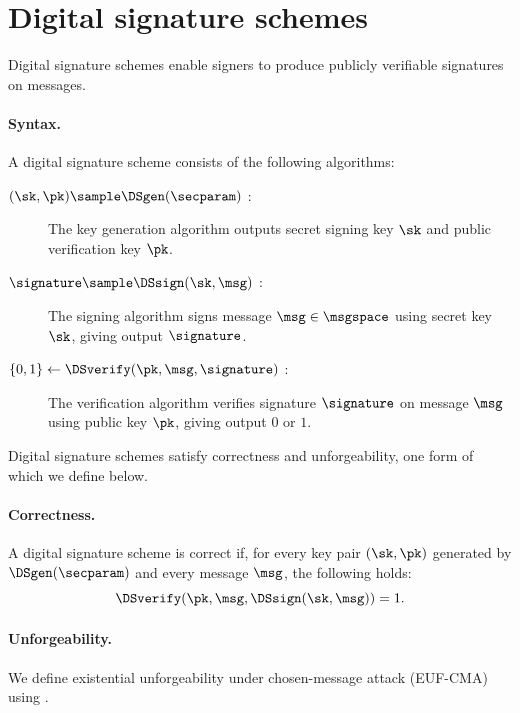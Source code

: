 \section{Digital signature schemes}\label{sec:prelims-signatures}

Digital signature schemes enable signers to produce publicly verifiable
signatures on messages.

\paragraph{Syntax.} A digital signature scheme consists of the following
algorithms:

\begin{description}

  \item[$(\sk,\pk) \sample \DSgen(\secparam)$ : ] The key generation algorithm
outputs secret signing key $\sk$ and public verification key $\pk$.

  \item[$\signature \sample \DSsign(\sk, \msg)$ : ] The signing algorithm signs
message $\msg \in \msgspace$ using secret key $\sk$, giving output $\signature$.

  \item[$\{0,1\} \leftarrow \DSverify(\pk,\msg,\signature)$ : ] The verification
algorithm verifies signature $\signature$ on message $\msg$ using public key
$\pk$, giving output $0$ or $1$.

\end{description}

Digital signature schemes satisfy correctness and unforgeability, one form of
which we define below.

\paragraph{Correctness.} A digital signature scheme is correct if, for every key
pair $(\sk,\pk)$ generated by $\DSgen(\secparam)$ and every message $\msg$, the
following holds:
%
\begin{equation*}
%
  \DSverify(\pk, \msg, \DSsign(\sk, \msg)) = 1.
%
\end{equation*}
%

\paragraph{Unforgeability.} We define existential unforgeability under
chosen-message attack (EUF-CMA) using .

